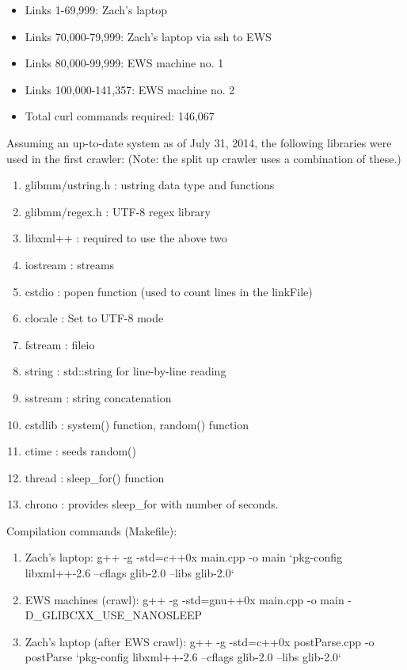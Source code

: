 \documentclass{acm} %
\begin{document}
\begin{CJK}{UTF8}{zhsong}
\begin{itemize}
 \item Links 1-69,999: Zach's laptop
 \item Links 70,000-79,999: Zach's laptop via ssh to EWS
 \item Links 80,000-99,999: EWS machine no. 1
 \item Links 100,000-141,357: EWS machine no. 2
 \item Total curl commands required: 146,067
\end{itemize}

Assuming an up-to-date system as of July 31, 2014, the following libraries were used in the first crawler: (Note: the split up crawler uses a combination of these.)

\begin{enumerate}
 \item glibmm/ustring.h : ustring data type and functions
 \item glibmm/regex.h : UTF-8 regex library
 \item libxml++ : required to use the above two
 \item iostream : streams
 \item cstdio : popen function (used to count lines in the linkFile)
 \item clocale : Set to UTF-8 mode
 \item fstream : fileio
 \item string : std::string for line-by-line reading
 \item sstream : string concatenation
 \item cstdlib : system() function, random() function
 \item ctime : seeds random()
 \item thread : sleep\_for() function
 \item chrono : provides sleep\_for with number of seconds.
\end{enumerate}

Compilation commands (Makefile):

\begin{enumerate}
 \item Zach's laptop: g++ -g -std=c++0x main.cpp -o main `pkg-config libxml++-2.6 --cflags glib-2.0 --libs glib-2.0`
 \item EWS machines (crawl): g++ -g -std=gnu++0x main.cpp -o main -D\_GLIBCXX\_USE\_NANOSLEEP
 \item Zach's laptop (after EWS crawl): g++ -g -std=c++0x postParse.cpp -o postParse `pkg-config libxml++-2.6 --cflags glib-2.0 --libs glib-2.0`
\end{enumerate}


\end{CJK}
\end{document}
